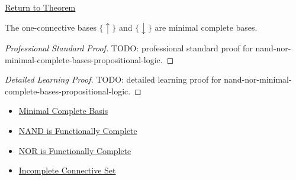 \newpage
{}
\label{prf:nand-nor-minimal-complete-bases-propositional-logic}

\begin{remark*}[Return]
\hyperref[thm:nand-nor-minimal-complete-bases-propositional-logic]{Return to Theorem}
\end{remark*}

\begin{theorem*}
The one-connective bases \(\{\uparrow\}\) and \(\{\downarrow\}\) are minimal
complete bases.
\end{theorem*}

\begin{proof}[Professional Standard Proof]
\LRAProofBodyStart
TODO: professional standard proof for nand-nor-minimal-complete-bases-propositional-logic.
\end{proof}

\begin{proof}[Detailed Learning Proof]
\LRAProofBodyStart
TODO: detailed learning proof for nand-nor-minimal-complete-bases-propositional-logic.
\end{proof}

\begin{remark*}
\end{remark*}

\begin{dependencies}
\begin{itemize}
  \item \hyperref[def:minimal-complete-basis-propositional-logic]{Minimal Complete Basis}
  \item \hyperref[thm:nand-functionally-complete-propositional-logic]{NAND is Functionally Complete}
  \item \hyperref[thm:nor-functionally-complete-propositional-logic]{NOR is Functionally Complete}
  \item \hyperref[def:incomplete-connective-set-propositional-logic]{Incomplete Connective Set}
\end{itemize}
\end{dependencies}

\clearpage
